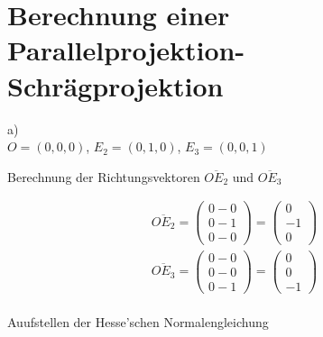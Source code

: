 
\setcounter{P-section}{12}
\renewcommand*\thesection{P\Nummerierung{\arabic{P-section}}}
\section{Berechnung einer Parallelprojektion- Schrägprojektion}

a) \\
\ensuremath{O=(0,0,0)}, \ensuremath{E_2=(0,1,0)}, \ensuremath{E_3 = (0,0,1)}

Berechnung der Richtungsvektoren \ensuremath{\overline{OE_2}} und \ensuremath{\overline{OE_3}}

\begin{gather}
	\overline{OE_2} = 
	\begin{pmatrix}
	0-0\\
	0-1\\
	0-0
	\end{pmatrix}
	= \begin{pmatrix}
	0\\-1\\0
	\end{pmatrix}\\
		\overline{OE_3} = 
	\begin{pmatrix}
	0-0\\
	0-0\\
	0-1
	\end{pmatrix}
	= \begin{pmatrix}
	0\\0\\-1
	\end{pmatrix}
	\end{gather}\\
	
Auufstellen der Hesse'schen Normalengleichung\\
	
